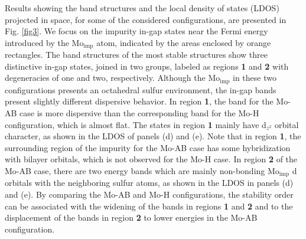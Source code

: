 \documentclass[pra,twocolumn,preprintnumbers,amsmath,amssymb]{revtex4}
\begin{document}
Results showing the band structures and the local density of states (LDOS) projected in space, for some of the considered configurations, are presented in Fig. \ref{fig3}.
We focus on the impurity in-gap states near the Fermi energy introduced by the Mo$_\mathrm{imp}$ atom, indicated by the areas enclosed by orange rectangles. The band structures of the most stable structures show three distinctive in-gap states, joined in two groups, labeled as regions \textbf{1} and \textbf{2} with degeneracies of one and two, respectively. Although the Mo$_\mathrm{imp}$ in these two configurations presents an octahedral sulfur environment, the in-gap bands present slightly different dispersive behavior.
In region \textbf{1}, the band for the Mo-AB case is more dispersive than the corresponding band for the Mo-H configuration, which is almost flat. The states in region \textbf{1} mainly have d$_{z^{2}}$ orbital character, as shown in the LDOS of panels (d) and (e).
Note that in region \textbf{1},  the surrounding region of the impurity for the Mo-AB case has some hybridization with bilayer orbitals,
which is not observed for the Mo-H case.
In region \textbf{2} of the Mo-AB case, there are two energy bands which are mainly non-bonding Mo$_\mathrm{imp}$ d orbitals with the neighboring sulfur atoms, as shown in the LDOS in panels (d) and (e).
By comparing the Mo-AB and Mo-H configurations, the stability order can be associated with the widening of the bands in regions \textbf{1} and \textbf{2} and to the displacement of the bands in region \textbf{2} to lower energies in the Mo-AB configuration.
\end{document}
